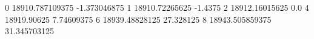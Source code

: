 0 18910.787109375 -1.373046875
1 18910.72265625 -1.4375
2 18912.16015625 0.0
4 18919.90625 7.74609375
6 18939.48828125 27.328125
8 18943.505859375 31.345703125
